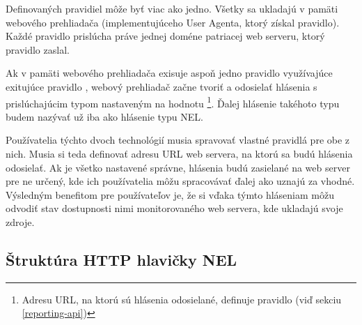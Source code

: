 Definovaných pravidiel môže byť viac ako jedno.
Všetky sa ukladajú v pamäti webového prehliadača (implementujúceho User Agenta, ktorý získal pravidlo).
Každé pravidlo prislúcha práve jednej doméne patriacej web serveru, ktorý pravidlo zaslal. 

Ak v pamäti webového prehliadača exisuje aspoň jedno pravidlo  využívajúce exitujúce pravidlo , 
webový prehliadač začne tvoriť a odosielať hlásenia s prislúchajúcim typom nastaveným na hodnotu \footnote{Adresu URL, na ktorú sú hlásenia odosielané, definuje pravidlo  (viď sekciu \ref{reporting-api})}. 
Ďalej hlásenie takéhoto typu budem nazývať už iba ako hlásenie typu NEL.

Používatelia týchto dvoch technológií musia spravovať vlastné pravidlá pre obe z nich.
Musia si teda definovať adresu URL web servera, na ktorú sa budú hlásenia odosielať.
Ak je všetko nastavené správne, hlásenia budú zasielané na web server pre ne určený, kde ich používatelia môžu spracovávať ďalej ako uznajú za vhodné.
Výsledným benefitom pre používateľov je, že si vďaka týmto hláseniam môžu odvodiť stav dostupnosti nimi monitorovaného web servera, kde ukladajú svoje zdroje.

\subsection{Štruktúra HTTP hlavičky NEL}
\label{struktura-http-hlavicky-nel}

